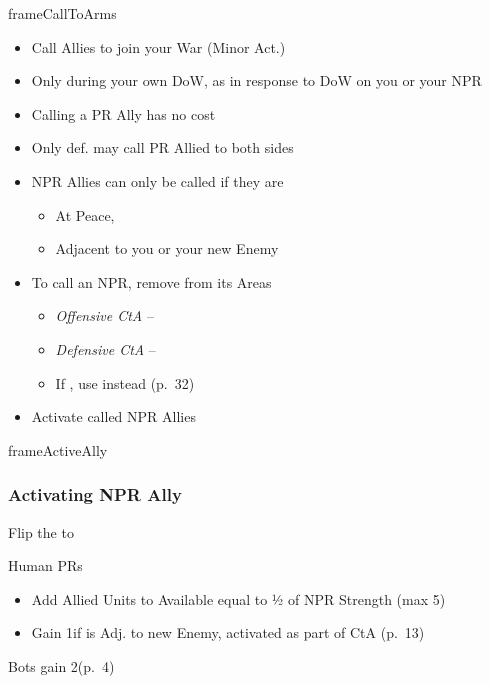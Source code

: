 \documentclass[10pt]{article}
\newlength{\fhActiveAlly} \setlength\fhActiveAlly{8\baselineskip}
\newlength{\fhCallToArms} \setlength\fhCallToArms{14\baselineskip}
\begin{document}
\begin{dynamiccontents*}{frameCallToArms}\begin{eubox}{\fhCallToArms}
	\begin{itemize}
		\item Call Allies to join your War (Minor Act.)
		\item Only during your own DoW,  as \reaction in response to DoW on you or your NPR \ally
		\item Calling a PR Ally has no cost
		\item Only def. may call PR Allied to both sides
		\item NPR Allies can only be called if they are
		\begin{itemize}
			\item At Peace, 
			\item Adjacent to you or your new Enemy
		\end{itemize}
		\item To call an NPR, remove \influence from its Areas
		\begin{itemize}
			\item \emph{Offensive CtA} -- \strong{2\influence}
			\item \emph{Defensive CtA} -- \strong{1\influence}
			\item If , use \colonists instead (p.~32)
		\end{itemize}
		\item {}Activate called NPR Allies
	\end{itemize}
\end{eubox}\end{dynamiccontents*}

\begin{dynamiccontents*}{frameActiveAlly}\begin{eubox}{\fhActiveAlly}
	\subsubsection*{Activating NPR Ally }
	\begin{itemize}
		\item Flip the \alliance to \activeally
		\item Human PRs
		\begin{itemize}
			\item Add Allied Units to Available \manpower equal to ½ of NPR Strength (max 5)
			\item Gain 1\milpower if \ally is Adj. to new Enemy,  activated as part of CtA (p.~13)
			\end{itemize}
		{\botrules
		\item Bots gain 2\botpower (p.~4)
		}
	\end{itemize}
\end{eubox}\end{dynamiccontents*}
\end{document}
